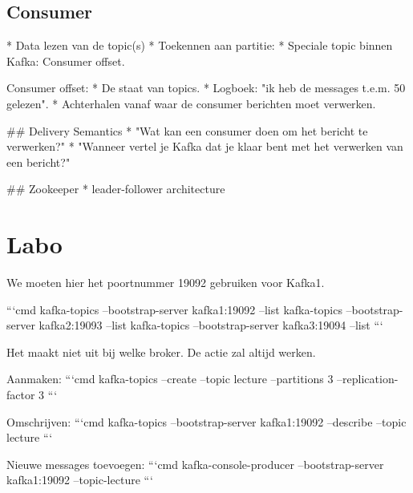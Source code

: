 \documentclass[a4paper,10pt,twoside]{report}
\begin{document}
\subsection{Consumer}
* Data lezen van de topic(s)
* Toekennen aan partitie:
* Speciale topic binnen Kafka: Consumer offset.


Consumer offset:
* De staat van topics.
* Logboek: "ik heb de messages t.e.m. 50 gelezen". 
* Achterhalen vanaf waar de consumer berichten moet verwerken.

## Delivery Semantics
* "Wat kan een consumer doen om het bericht te verwerken?"
* "Wanneer vertel je Kafka dat je klaar bent met het verwerken van een bericht?"


## Zookeeper
* leader-follower architecture


\section{Labo}

We moeten hier het poortnummer 19092 gebruiken voor Kafka1. 

```cmd
kafka-topics --bootstrap-server kafka1:19092 --list
kafka-topics --bootstrap-server kafka2:19093 --list
kafka-topics --bootstrap-server kafka3:19094 --list
```

Het maakt niet uit bij welke broker. De actie zal altijd werken.

Aanmaken:
```cmd
kafka-topics --create --topic lecture --partitions 3 --replication-factor 3
```

Omschrijven:
```cmd
kafka-topics --bootstrap-server kafka1:19092 --describe --topic lecture
```

Nieuwe messages toevoegen:
```cmd
kafka-console-producer --bootstrap-server kafka1:19092 --topic-lecture
```
	
\end{document}
